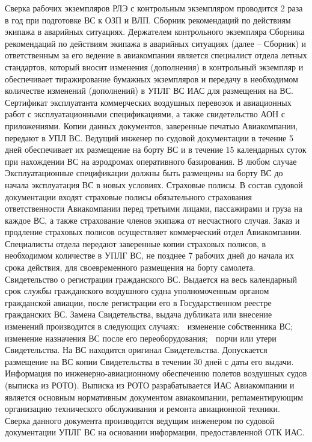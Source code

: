 Сверка рабочих экземпляров РЛЭ с контрольным экземпляром проводится 2 раза в год при подготовке ВС к ОЗП и ВЛП. 
Сборник рекомендаций по действиям экипажа в аварийных ситуациях. 
Держателем контрольного экземпляра Сборника рекомендаций по действиям экипажа в аварийных ситуациях (далее – Сборник) и ответственным за его ведение в авиакомпании является специалист отдела летных стандартов, который вносит изменения (дополнения) в контрольный экземпляр и обеспечивает тиражирование бумажных экземпляров и передачу в необходимом количестве изменений (дополнений) в УПЛГ ВС ИАС для размещения на ВС.  
Сертификат эксплуатанта коммерческих воздушных перевозок и авиационных работ с эксплуатационными спецификациями, а также свидетельство АОН с приложениями.
Копии данных документов, заверенные печатью Авиакомпании, передают в УПЛ ВС. Ведущий инженер по судовой документации в течение 5 дней обеспечивает их размещение на борту ВС и в течение 15 календарных суток при нахождении ВС на аэродромах оперативного базирования. В любом случае Эксплуатационные спецификации должны быть размещены на борту ВС до начала эксплуатация ВС в новых условиях.
 Страховые полисы.
В состав судовой документации входят страховые полисы обязательного страхования ответственности Авиакомпании перед третьими лицами, пассажирами и груза на каждое ВС, а также страхование членов экипажа от несчастного случая. Заказ и продление страховых полисов осуществляет коммерческий отдел Авиакомпании. Специалисты отдела передают заверенные копии страховых полисов, в необходимом количестве в УПЛГ ВС, не позднее 7 рабочих дней до начала их срока действия, для своевременного размещения на борту самолета. 
Свидетельство о регистрации гражданского ВС.
Выдается на весь календарный срок службы гражданского воздушного судна уполномоченным органом гражданской авиации, после регистрации его в Государственном реестре гражданских ВС.
Замена Свидетельства, выдача дубликата или внесение изменений производится в следующих случаях:
	изменение собственника ВС;
	изменение назначения ВС после его переоборудования;
	порчи или утери Свидетельства.
На ВС находится оригинал Свидетельства. Допускается размещение на ВС копии Свидетельства в течении 30 дней с даты его выдачи.
Информация по инженерно-авиационному обеспечению полетов воздушных судов (выписка из РОТО).
Выписка из РОТО разрабатывается ИАС Авиакомпании и является основным нормативным документом авиакомпании, регламентирующим организацию технического обслуживания и ремонта авиационной техники.     Сверка данного документа производится ведущим инженером по судовой документации УПЛГ ВС на основании информации, предоставленной ОТК ИАС. 
